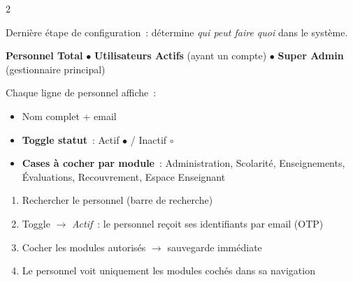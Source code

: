 \begin{multicols}{2}

{\scriptsize Derni\`ere \'etape de configuration~: d\'etermine \textit{qui peut faire quoi} dans le syst\`eme.}


{\scriptsize \textbf{Personnel Total} $\bullet$ \textbf{Utilisateurs Actifs} (ayant un compte) $\bullet$ \textbf{Super Admin} (gestionnaire principal)}


{\scriptsize Chaque ligne de personnel affiche~:}
\begin{itemize}[font=\scriptsize,itemsep=0pt]
  \item Nom complet + email
  \item \textbf{Toggle statut}~: Actif \textcolor{emerald}{$\bullet$} / Inactif \textcolor{slatelight}{$\circ$}
  \item \textbf{Cases \`a cocher par module}~: Administration, Scolarit\'e, Enseignements, \'Evaluations, Recouvrement, Espace Enseignant
\end{itemize}

\begin{stepbox}[title={\faIcon{shield-alt}\ Attribuer des droits}]
\begin{enumerate}[label=\textcolor{indigo}{\scriptsize\textbf{\arabic*.}},font=\scriptsize,itemsep=0pt]
  \item Rechercher le personnel (barre de recherche)
  \item Toggle $\to$ \textit{Actif}~: le personnel re\c{c}oit ses identifiants par email (OTP)
  \item Cocher les modules autoris\'es $\to$ sauvegarde imm\'ediate
  \item Le personnel voit uniquement les modules coch\'es dans sa navigation
\end{enumerate}
\end{stepbox}

\columnbreak


\begin{center}
\end{center}


\end{multicols}
